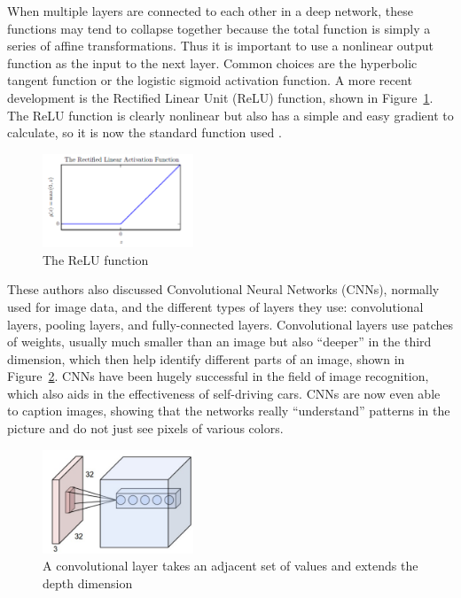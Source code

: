 \documentclass[]{report}
\begin{document}
When multiple layers are connected to each other in a deep network, these functions may tend to collapse together because the total function is simply a series of affine transformations. Thus it is important to use a nonlinear output function as the input to the next layer. Common choices are the hyperbolic tangent function or the logistic sigmoid activation function. A more recent development is the Rectified Linear Unit (ReLU) function, shown in Figure~\ref{relu}. The ReLU function is clearly nonlinear but also has a simple and easy gradient to calculate, so it is now the standard function used \cite{Goodfellow-et-al-2016,ThreeGiants}.

\begin{figure}
	\centering
	\includegraphics[width=0.4\textwidth]{../images/relu}
	\caption{The ReLU function \cite{Goodfellow-et-al-2016}}
	\label{relu}
\end{figure}



These authors also discussed Convolutional Neural Networks (CNNs), normally used for image data, and the different types of layers they use: convolutional layers, pooling layers, and fully-connected layers. Convolutional layers use patches of weights, usually much smaller than an image but also ``deeper'' in the third dimension, which then help identify different parts of an image, shown in Figure~\ref{convolution-exp}. CNNs have been hugely successful in the field of image recognition, which also aids in the effectiveness of self-driving cars. CNNs are now even able to caption images, showing that the networks really ``understand'' patterns in the picture and do not just see pixels of various colors.


\begin{figure}
	\centering
	\includegraphics[width=0.4\textwidth]{../images/convolutions2}
	\caption{A convolutional layer takes an adjacent set of values and extends the depth dimension \cite{karpathy}}
	\label{convolution-exp}
\end{figure}
\end{document}
